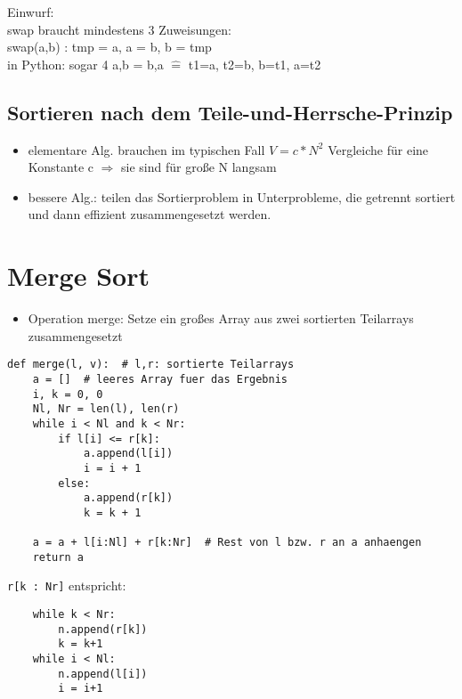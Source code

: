     Einwurf: \\
    swap braucht mindestens 3 Zuweisungen: \\
    \hspace*{5mm} swap(a,b) : tmp = a, a = b, b = tmp \\
    in Python: sogar 4 a,b = b,a $\widehat{=}$ t1=a, t2=b, b=t1, a=t2


    \subsection*{Sortieren nach dem Teile-und-Herrsche-Prinzip}

    \begin{itemize}
        \item elementare Alg. brauchen im typischen Fall $V= c * N^2$ Vergleiche für eine Konstante c $\Rightarrow$ sie sind für große N langsam
        \item bessere Alg.: teilen das Sortierproblem in Unterprobleme, die getrennt sortiert und dann effizient zusammengesetzt werden.

    \end{itemize}

    \section{Merge Sort}

    \begin{itemize}
        \item Operation merge: Setze ein großes Array aus zwei sortierten Teilarrays zusammengesetzt
    \end{itemize}

    \begin{verbatim}
def merge(l, v):  # l,r: sortierte Teilarrays
    a = []  # leeres Array fuer das Ergebnis
    i, k = 0, 0
    Nl, Nr = len(l), len(r)
    while i < Nl and k < Nr:
        if l[i] <= r[k]:
            a.append(l[i])
            i = i + 1
        else:
            a.append(r[k])
            k = k + 1

    a = a + l[i:Nl] + r[k:Nr]  # Rest von l bzw. r an a anhaengen
    return a
    \end{verbatim}


    \verb|r[k : Nr]| entspricht: \\
    \begin{verbatim}
    while k < Nr:
        n.append(r[k])
        k = k+1
    while i < Nl:
        n.append(l[i])
        i = i+1
    \end{verbatim}


